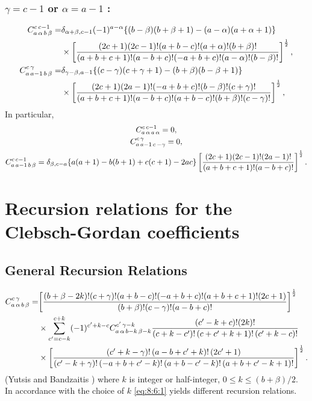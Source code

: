 \subsubsection{ $\gamma=c-1$ or $\alpha=a-1$ :}
\begin{align}
C_{a\,\alpha\,b\,\beta}^{c\,c-1}= & \delta_{\alpha+\beta, c-1}(-1)^{a-\alpha}\{(b-\beta)(b+\beta+1)-(a-\alpha)(a+\alpha+1)\}  \notag\\
& \times\left[\frac{(2 c+1)(2 c-1)!(a+b-c)!(a+\alpha)!(b+\beta)!}{(a+b+c+1)!(a-b+c)!(-a+b+c)!(a-\alpha)!(b-\beta)!}\right]^{\frac{1}{2}}, \label{eq:8:5:44}\\
C_{a\,a-1\,b\,\beta}^{c\,\gamma}= & \delta_{\gamma-\beta, a-1}\{(c-\gamma)(c+\gamma+1)-(b+\beta)(b-\beta+1)\}  \notag\\
& \times\left[\frac{(2 c+1)(2 a-1)!(-a+b+c)!(b-\beta)!(c+\gamma)!}{(a+b+c+1)!(a-b+c)!(a+b-c)!(b+\beta)!(c-\gamma)!}\right]^{\frac{1}{2}}, \label{eq:8:5:45}
\end{align}
In particular,
\begin{gather}
C_{a\,\alpha\,a\,\alpha}^{c\,c-1}=0, \label{eq:8:5:46}\\
C_{a\,a-1\,c\,-\gamma}^{c\,\gamma}=0, \label{eq:8:5:47}\\
C_{a\,a-1\,b\,\beta}^{c\,c-1}=\delta_{\beta, c-a}\{a(a+1)-b(b+1)+c(c+1)-2 a c\}\left[\frac{(2 c+1)(2 c-1)!(2 a-1)!}{(a+b+c+1)!(a-b+c)!}\right]^{\frac{1}{2}} . \label{eq:8:5:48}
\end{gather}
\section{Recursion relations for the Clebsch-Gordan coefficients}\label{sec:8.6}
\subsection{General Recursion Relations}\label{sec:8.6.1}
\begin{align}
C_{a\,\alpha\,b\,\beta}^{c\,\gamma}= & {\left[\frac{(b+\beta-2 k)!(c+\gamma)!(a+b-c)!(-a+b+c)!(a+b+c+1)!(2 c+1)}{(b+\beta)!(c-\gamma)!(a-b+c)!}\right]^{\frac{1}{2}} }  \notag\\
& \times \sum_{c^{\prime}=c-k}^{c+k}(-1)^{c^{\prime}+k-c} C_{a\,\alpha\,b-k\,\beta-k}^{c^{\prime}\,\gamma-k} \frac{\left(c^{\prime}-k+c\right)!(2 k)!}{\left(c+k-c^{\prime}\right)!\left(c+c^{\prime}+k+1\right)!\left(c^{\prime}+k-c\right)!}  \notag\\
& \times\left[\frac{\left(c^{\prime}+k-\gamma\right)!\left(a-b+c^{\prime}+k\right)!\left(2 c^{\prime}+1\right)}{\left(c^{\prime}-k+\gamma\right)!\left(-a+b+c^{\prime}-k\right)!\left(a+b-c^{\prime}-k\right)!\left(a+b+c^{\prime}-k+1\right)!}\right]^{\frac{1}{2}}. \label{eq:8:6:1}
\end{align}
(Yutsis and Bandzaitis \cite{ref045}) where $k$ is integer or half-integer, $0 \leq k \leq(b+\beta) / 2$. In accordance with the choice of $k$ \eqref{eq:8:6:1} yields different recursion relations.

